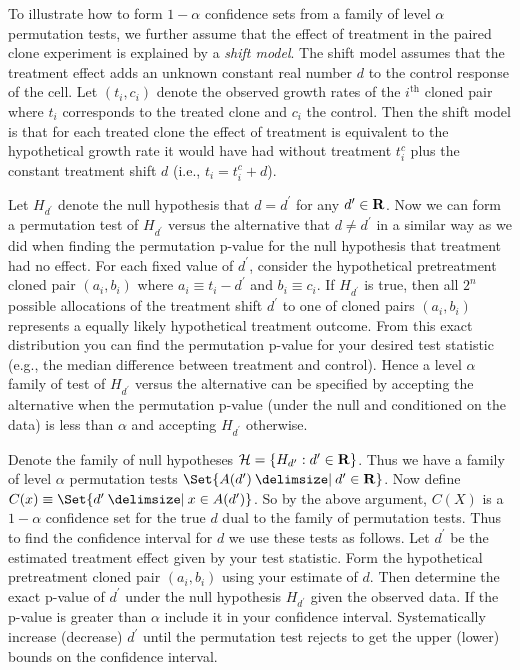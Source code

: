 \begin{example}[continues=exa:cont] To illustrate how to form $1-\alpha$
confidence sets from a family of level $\alpha$ permutation tests, we further
assume that the effect of treatment in the paired clone experiment is explained
by a \emph{shift model}.  The shift model assumes that the treatment effect
adds an unknown constant real number $d$ to the control response of the cell.
Let $(t_i, c_i)$ denote the observed growth rates of the $i^\text{th}$ cloned
pair where $t_i$ corresponds to the treated clone and $c_i$ the control.  Then
the shift model is that for each treated clone the effect of treatment is
equivalent to the hypothetical growth rate it would have had without treatment
$t_i^c$ plus the constant treatment shift $d$ (i.e., $t_i = t_i^c + d$).

Let $H_{d^\prime}$ denote the null hypothesis that $d=d^\prime$ for any
$d^\prime \in \mathbf{R}$.  Now we can form a permutation test of $H_{d^\prime}$
versus the alternative that $d \neq d^\prime$ in a similar way as we did when
finding the permutation p-value for the null hypothesis that treatment had no
effect. For each fixed value of $d^\prime$, consider the hypothetical
pretreatment cloned pair $(a_i, b_i)$ where $a_i\equiv t_i-d^\prime$ and $b_i
\equiv c_i$. If $H_{d^\prime}$ is true, then all $2^n$ possible allocations of
the treatment shift $d^\prime$ to one of cloned pairs $(a_i, b_i)$ represents a
equally likely hypothetical treatment outcome. From this exact distribution you
can find the permutation p-value for your desired test statistic (e.g., the
median difference between treatment and control). Hence a level $\alpha$ family
of test of $H_{d^\prime}$ versus the alternative can be specified by accepting
the alternative when the permutation p-value (under the null and conditioned on
the data) is less than $\alpha$ and accepting $H_{d^\prime}$ otherwise. 

Denote the family of null hypotheses $\mathcal{H} = \{H_{d^\prime} : d^\prime
\in \mathbf{R}\}$.  Thus we have a family of level $\alpha$ permutation tests
$\Set{A(d^\prime) \given d^\prime \in \reals}$. Now define $C(x) \equiv \Set{d' \given x \in
A(d')}$.  So by the above argument, $C(X)$ is a $1-\alpha$ confidence set
for the true $d$ dual to the family of permutation tests.
Thus to find the confidence interval for $d$ we use these tests as follows.
Let $d^\prime$ be the estimated treatment effect given by your test statistic.
Form the hypothetical pretreatment cloned pair $(a_i, b_i)$ using your estimate
of $d$.  Then determine the exact p-value of $d^\prime$ under the null
hypothesis $H_{d^\prime}$ given the observed data. If the p-value is greater
than $\alpha$ include it in your confidence interval.  Systematically increase
(decrease) $d^\prime$ until the permutation test rejects to get the upper (lower)
bounds on the confidence interval.


\end{example}
